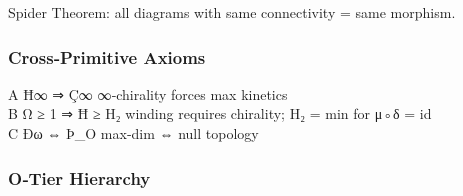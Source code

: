 Spider Theorem: all diagrams with same connectivity = same morphism.

\hypertarget{crossprimitive-axioms}{%
\subsubsection{Cross‑Primitive Axioms}\label{crossprimitive-axioms}}

A \textbar{} Ħ∞ ⇒ Ç∞ \textbar{} ∞‑chirality forces max kinetics
\textbar{}\\
B \textbar{} Ω ≥ 1 ⇒ Ħ ≥ H₂ \textbar{} winding requires chirality; H₂ =
min for μ◦δ = id \textbar{}\\
C \textbar{} Ðω ⇔ Þ\_O \textbar{} max‑dim ⇔ null topology \textbar{}

\hypertarget{otier-hierarchy}{%
\subsubsection{O‑Tier Hierarchy}\label{otier-hierarchy}}

